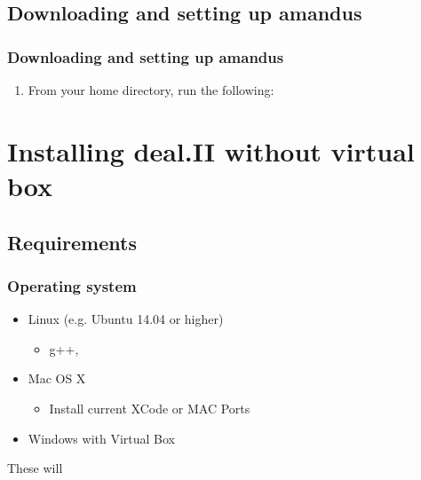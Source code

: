 \subsection{Downloading and setting up amandus}
\begin{frame}
  \frametitle{Downloading and setting up amandus}
  \begin{enumerate}
  \item From your home directory, run the following:
    \begin{block}{}
      
    \end{block}
  \end{enumerate}
\end{frame}

\section[Installing]{Installing deal.II without virtual box}
\subsection{Requirements}

\begin{frame}
  \frametitle{Operating system}
  \begin{itemize}
  \item Linux (e.g. Ubuntu 14.04 or higher)
    \begin{itemize}
    \item g++, 
    \end{itemize}
  \item Mac OS X
    \begin{itemize}
    \item Install current XCode or MAC Ports
    \end{itemize}
  \item Windows with Virtual Box
  \end{itemize}
  These will 
\end{frame}

